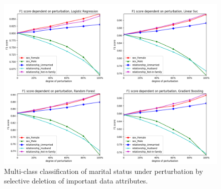 \documentclass{llncs}
\begin{document}
\begin{figure}[!h]
	\centering
	\includegraphics[width=1\textwidth]{figures/perturbation/adults_marital_status/perturb_marital_combined}
	\caption{Multi-class classification of marital status under perturbation by selective deletion of important data attributes.}
	\label{fig:results_perturbation_marital_status}
\end{figure}


\end{document}
